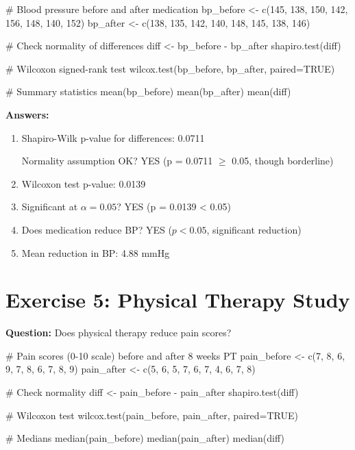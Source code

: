 \documentclass[11pt]{article}
\begin{document}
\begin{rcode}
# Blood pressure before and after medication
bp_before <- c(145, 138, 150, 142, 156, 148, 140, 152)
bp_after <- c(138, 135, 142, 140, 148, 145, 138, 146)

# Check normality of differences
diff <- bp_before - bp_after
shapiro.test(diff)

# Wilcoxon signed-rank test
wilcox.test(bp_before, bp_after, paired=TRUE)

# Summary statistics
mean(bp_before)
mean(bp_after)
mean(diff)
\end{rcode}

\textbf{Answers:}
\begin{enumerate}
\item \textcolor{answergreen}{Shapiro-Wilk p-value for differences: 0.0711}

\textcolor{answergreen}{Normality assumption OK? YES (p = 0.0711 $\geq$ 0.05, though borderline)}

\item \textcolor{answergreen}{Wilcoxon test p-value: 0.0139}

\item \textcolor{answergreen}{Significant at $\alpha = 0.05$? YES (p = 0.0139 < 0.05)}

\item \textcolor{answergreen}{Does medication reduce BP? YES ($p < 0.05$, significant reduction)}

\item \textcolor{answergreen}{Mean reduction in BP: 4.88 mmHg}
\end{enumerate}

\section{Exercise 5: Physical Therapy Study}

\textbf{Question:} Does physical therapy reduce pain scores?

\begin{rcode}
# Pain scores (0-10 scale) before and after 8 weeks PT
pain_before <- c(7, 8, 6, 9, 7, 8, 6, 7, 8, 9)
pain_after <- c(5, 6, 5, 7, 6, 7, 4, 6, 7, 8)

# Check normality
diff <- pain_before - pain_after
shapiro.test(diff)

# Wilcoxon test
wilcox.test(pain_before, pain_after, paired=TRUE)

# Medians
median(pain_before)
median(pain_after)
median(diff)
\end{rcode}
\end{document}
